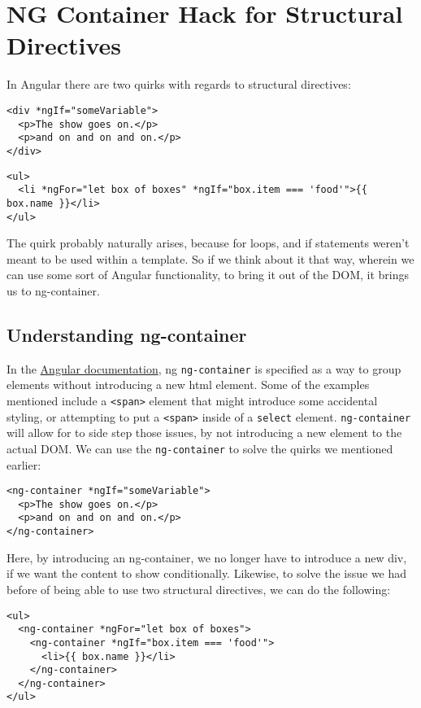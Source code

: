 \chapter{ NG Container Hack for Structural Directives }

In Angular there are two quirks with regards to structural directives:
\begin{lstlisting}[caption=Quirk \#1 - Requiring Extra Element to Implement Structural Directive]
<div *ngIf="someVariable">
  <p>The show goes on.</p>
  <p>and on and on and on.</p>
</div>
\end{lstlisting}

\begin{lstlisting}[caption=Quirk \#2 - Inability to apply more than two 
structural directives on the same element]
<ul>
  <li *ngFor="let box of boxes" *ngIf="box.item === 'food'">{{ box.name }}</li>
</ul>
\end{lstlisting}

The quirk probably naturally arises, because for loops, and if statements
weren't meant to be used within a template. So if we think about it that way,
wherein we can use some sort of Angular functionality, to bring it out of the 
DOM, it brings us to ng-container. 

\section{Understanding ng-container}
In the \href{https://angular.io/guide/structural-directives#group-sibling-elements-with-ng-container}{Angular documentation}, ng 
\lstinline{ng-container} is specified as a way to group elements without introducing a new 
html element. Some of the examples mentioned include a \lstinline{<span>} element that 
might introduce some accidental styling, or attempting to put a \lstinline{<span>} inside 
of a \lstinline{select} element. \lstinline{ng-container} will allow for to side step those 
issues, by not introducing a new element to the actual DOM. We can use the 
\lstinline{ng-container} to solve the quirks we mentioned earlier: 

\begin{lstlisting}[caption=Solution to Quirk \#1 - Requiring Extra Element 
  to Implement Structural Directive]
<ng-container *ngIf="someVariable">
  <p>The show goes on.</p>
  <p>and on and on and on.</p>
</ng-container>
\end{lstlisting}

Here, by introducing an ng-container, we no longer have to introduce a new div, 
if we want the content to show conditionally. Likewise, to solve the issue we 
had before of being able to use two structural directives, we can do the 
following: 
\begin{lstlisting}[caption=Solution to Quirk \#2 - Inability to apply more 
  than two structural directives on the same element]
<ul>
  <ng-container *ngFor="let box of boxes">
    <ng-container *ngIf="box.item === 'food'">
      <li>{{ box.name }}</li>
    </ng-container>
  </ng-container>
</ul>  
\end{lstlisting} 

